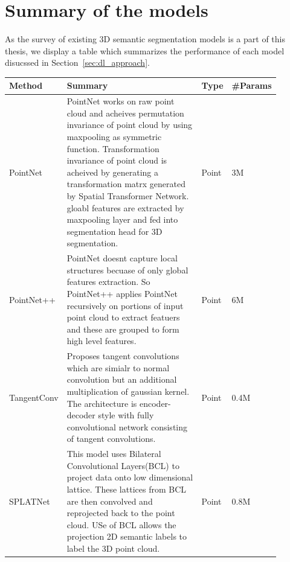     \section{Summary of the models}
    As the survey of existing 3D semantic segmentation models is a part of this thesis, we display a table which summarizes the performance of each model disucssed in Section~\ref{sec:dl_approach}.
    \begin{longtable}{|p{0.15\linewidth} | p{0.59\linewidth}| p{0.06\linewidth} |p{0.09\linewidth}|}
            \hline
            \textbf{Method} & \textbf{Summary} & \textbf{Type} & \textbf{\#Params} \\
            \hline 
            PointNet\cite{Qi_2017_CVPR_pointnet} &
            PointNet works on raw point cloud and acheives permutation invariance of point cloud by using maxpooling as symmetric function.
            Transformation invariance of point cloud is acheived by generating a transformation matrx generated by Spatial Transformer Network.
            gloabl features are extracted by maxpooling layer and fed into segmentation head for 3D segmentation.
            & Point & 3M \\
            \hline
            PointNet++\cite{qi2017pointnet++} &
            PointNet doesnt capture local structures becuase of only global features extraction.
            So PointNet++ applies PointNet recursively on portions of input point cloud to extract featuers and these are grouped to form high level features.
            & Point & 6M \\
            \hline
            TangentConv\cite{Tatarchenko_2018_CVPR_tangconv} &
            Proposes tangent convolutions which are simialr to normal convolution but an additional multiplication of gaussian kernel.
            The architecture is encoder-decoder style with fully convolutional network consisting of tangent convolutions.
            & Point & 0.4M\\
            \hline
            SPLATNet\cite{Su_2018_CVPR_splatnet} &
            This model uses Bilateral Convolutional Layers(BCL) to project data onto low dimensional lattice.
            These lattices from BCL are then convolved and reprojected back to the point cloud.
            USe of BCL allows the projection 2D semantic labels to label the 3D point cloud.
            & Point & 0.8M \\

\end{longtable}
